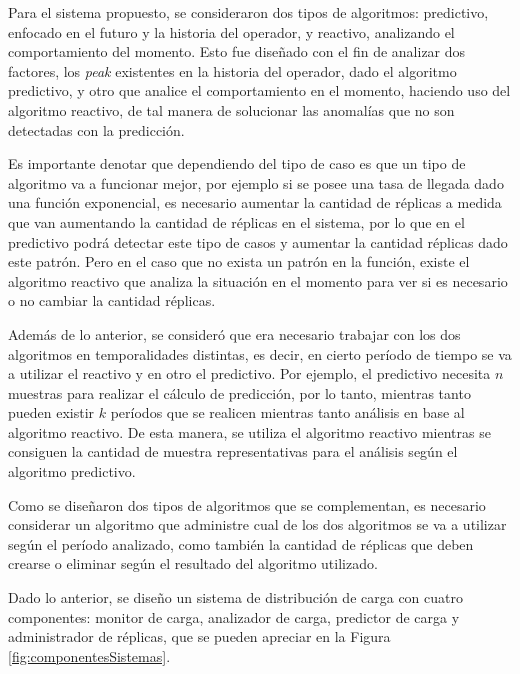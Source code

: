 Para el sistema propuesto, se consideraron dos tipos de algoritmos: predictivo, enfocado en el futuro y la historia del operador, y reactivo, analizando el comportamiento del momento. Esto fue diseñado con el fin de analizar dos factores, los \textit{peak} existentes en la historia del operador, dado el algoritmo predictivo, y otro que analice el comportamiento en el momento, haciendo uso del algoritmo reactivo, de tal manera de solucionar las anomalías que no son detectadas con la predicción.

Es importante denotar que dependiendo del tipo de caso es que un tipo de algoritmo va a funcionar mejor, por ejemplo si se posee una tasa de llegada dado una función exponencial, es necesario aumentar la cantidad de réplicas a medida que van aumentando la cantidad de réplicas en el sistema, por lo que en el predictivo podrá detectar este tipo de casos y aumentar la cantidad réplicas dado este patrón. Pero en el caso que no exista un patrón en la función, existe el algoritmo reactivo que analiza la situación en el momento para ver si es necesario o no cambiar la cantidad réplicas.

Además de lo anterior, se consideró que era necesario trabajar con los dos algoritmos en temporalidades distintas, es decir, en cierto período de tiempo se va a utilizar el reactivo y en otro el predictivo. Por ejemplo, el predictivo necesita $n$ muestras para realizar el cálculo de predicción, por lo tanto, mientras tanto pueden existir $k$ períodos que se realicen mientras tanto análisis en base al algoritmo reactivo. De esta manera, se utiliza el algoritmo reactivo mientras se consiguen la cantidad de muestra representativas para el análisis según el algoritmo predictivo.


Como se diseñaron dos tipos de algoritmos que se complementan, es necesario considerar un algoritmo que administre cual de los dos algoritmos se va a utilizar según el período analizado, como también la cantidad de réplicas que deben crearse o eliminar según el resultado del algoritmo utilizado.

Dado lo anterior, se diseño un sistema de distribución de carga con cuatro componentes: monitor de carga, analizador de carga, predictor de carga y administrador de réplicas, que se pueden apreciar en la Figura \ref{fig:componentesSistemas}.

